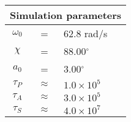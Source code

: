 \begin{tabular}{ccl}
\multicolumn{3}{c}{Simulation parameters} \\
\hline
$\omega_0$  &=& 62.8 rad/s\\
$\chi$  &=& 88.00$^{\circ}$ \\
$a_0$ &=& 3.00$^{\circ}$ \\
$\tau_{P}$ &$\approx$& $ 1.0\times 10^{5} $ \\
$\tau_{A}$ &$\approx$& $ 3.0\times 10^{5} $ \\
$\tau_{S}$ &$\approx$& $ 4.0\times 10^{7} $ \\
\end{tabular}